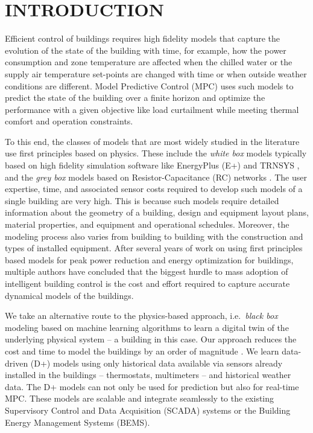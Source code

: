 \section{INTRODUCTION}
\label{S:intro}

Efficient control of buildings requires high fidelity models that capture the evolution of the state of the building with time, for example, how the power consumption and zone temperature are affected when the chilled water or the supply air temperature set-points are changed with time or when outside weather conditions are different.
Model Predictive Control (MPC) uses such models to predict the state of the building over a finite horizon and optimize the performance with a given objective like load curtailment while meeting thermal comfort and operation constraints.

To this end, the classes of models that are most widely studied in the literature use first principles based on physics. 
These include the \textit{white box} models typically based on high fidelity simulation software like EnergyPlus (E+) \cite{Deru2011} and TRNSYS \cite{Transys1975}, and the \textit{grey box} models based on Resistor-Capacitance (RC) networks \cite{Deng2010}.
The user expertise, time, and associated sensor costs required to develop such models of a single building are very high.
This is because such models require detailed information about the geometry of a building, design and equipment layout plans, material properties, and equipment and operational schedules. 
Moreover, the modeling process also varies from building to building with the construction and types of installed equipment. 
After several years of work on using first principles based models for peak power reduction and energy optimization for buildings, multiple authors \cite{Sturzenegger2016,vzavcekova2014} have concluded that the biggest hurdle to mass adoption of intelligent building control is the cost and effort required to capture accurate dynamical models of the buildings.

We take an alternative route to the physics-based approach, i.e.~\textit{black box} modeling based on machine learning algorithms to learn a digital twin of the underlying physical system -- a building in this case.
Our approach reduces the cost and time to model the buildings by an order of magnitude \cite{JainICCPS2018,JainTCPS2018,JainCDC2017,JainACC2017,nghiemetal16gp,behletal15dradvisor}.
We learn data-driven (D+) models using only historical data available via sensors already installed in the buildings -- thermostats, multimeters -- and historical weather data.
The D+ models can not only be used for prediction but also for real-time MPC.
These models are scalable and integrate seamlessly to the existing Supervisory Control and Data Acquisition (SCADA) systems  or the Building Energy Management Systems (BEMS).

